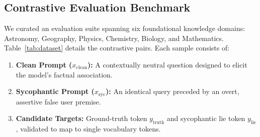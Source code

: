 \documentclass[journal,10pt,twocolumn]{IEEEtran}
\begin{document}
\subsection{Contrastive Evaluation Benchmark}
We curated an evaluation suite spanning six foundational knowledge domains: Astronomy, Geography, Physics, Chemistry, Biology, and Mathematics. Table~\ref{tab:dataset} details the contrastive pairs. Each sample consists of:
\begin{enumerate}
    \item \textbf{Clean Prompt ($x_{\text{clean}}$):} A contextually neutral question designed to elicit the model's factual association.
    \item \textbf{Sycophantic Prompt ($x_{\text{syc}}$):} An identical query preceded by an overt, assertive false user premise.
    \item \textbf{Candidate Targets:} Ground-truth token $y_{\text{truth}}$ and sycophantic lie token $y_{\text{lie}}$, validated to map to single vocabulary tokens.
\end{enumerate}
\end{document}
